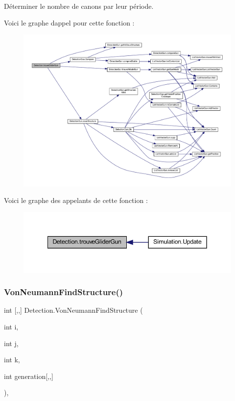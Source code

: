 Déterminer le nombre de canons par leur période. 

Voici le graphe d\textquotesingle{}appel pour cette fonction \+:
\nopagebreak
\begin{figure}[H]
\begin{center}
\leavevmode
\includegraphics[width=350pt]{class_detection_aa21c434f39d4e9d901635d9db2a4bbca_cgraph}
\end{center}
\end{figure}
Voici le graphe des appelants de cette fonction \+:\nopagebreak
\begin{figure}[H]
\begin{center}
\leavevmode
\includegraphics[width=342pt]{class_detection_aa21c434f39d4e9d901635d9db2a4bbca_icgraph}
\end{center}
\end{figure}
\mbox{\label{class_detection_a1909fbb1d96dbc6fed37fabc89444945}} 
\subsubsection{\texorpdfstring{Von\+Neumann\+Find\+Structure()}{VonNeumannFindStructure()}}
{\footnotesize\ttfamily int \mbox{[},,\mbox{]} Detection.\+Von\+Neumann\+Find\+Structure (\begin{DoxyParamCaption}\item[{int}]{i,  }\item[{int}]{j,  }\item[{int}]{k,  }\item[{int}]{generation\mbox{[},,\mbox{]} }\end{DoxyParamCaption})\hspace{0.3cm}{\ttfamily [inline]}, {\ttfamily [private]}}



